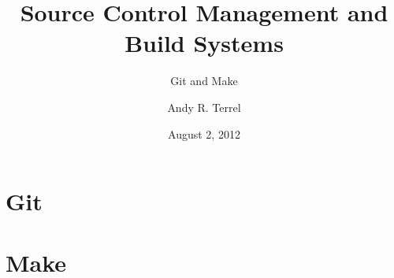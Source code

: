 \documentclass{beamer}
\title{Source Control Management and Build Systems}
\subtitle{Git and Make}
\author{Andy R. Terrel}
\institute{The Texas Advanced Computing Center}
\date{August 2, 2012}  %
\begin{document}
\begin{frame}
  \titlepage
\end{frame}



\section{Git}





\section{Make}
\end{document}
